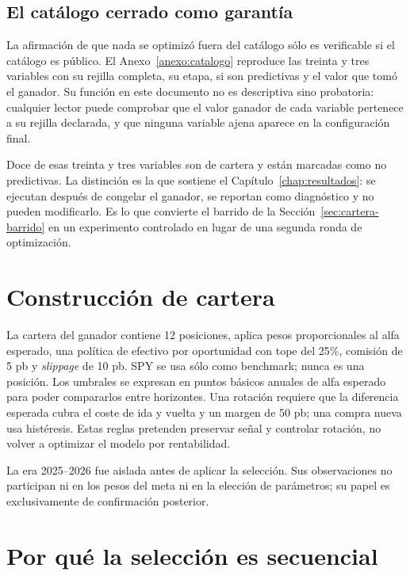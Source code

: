\subsection*{El catálogo cerrado como garantía}

La afirmación de que nada se optimizó fuera del catálogo sólo es verificable si el catálogo es
público. El Anexo~\ref{anexo:catalogo} reproduce las treinta y tres variables con su rejilla
completa, su etapa, si son predictivas y el valor que tomó el ganador. Su función en este documento
no es descriptiva sino probatoria: cualquier lector puede comprobar que el valor ganador de cada
variable pertenece a su rejilla declarada, y que ninguna variable ajena aparece en la configuración
final.

Doce de esas treinta y tres variables son de cartera y están marcadas como no predictivas. La
distinción es la que sostiene el Capítulo~\ref{chap:resultados}: se ejecutan después de congelar el
ganador, se reportan como diagnóstico y no pueden modificarlo. Es lo que convierte el barrido de la
Sección~\ref{sec:cartera-barrido} en un experimento controlado en lugar de una segunda ronda de
optimización.

\section{Construcción de cartera}

La cartera del ganador contiene 12 posiciones, aplica pesos proporcionales al alfa esperado, una
política de efectivo por oportunidad con tope del 25\%, comisión de 5 pb y \textit{slippage} de 10
pb. SPY se usa sólo como benchmark; nunca es una posición. Los umbrales se expresan en puntos
básicos anuales de alfa esperado para poder compararlos entre horizontes. Una rotación requiere que
la diferencia esperada cubra el coste de ida y vuelta y un margen de 50 pb; una compra nueva usa
histéresis. Estas reglas pretenden preservar señal y controlar rotación, no volver a optimizar el
modelo por rentabilidad.

La era 2025--2026 fue aislada antes de aplicar la selección. Sus observaciones no participan ni en
los pesos del meta ni en la elección de parámetros; su papel es exclusivamente de confirmación
posterior.

\section{Por qué la selección es secuencial}

